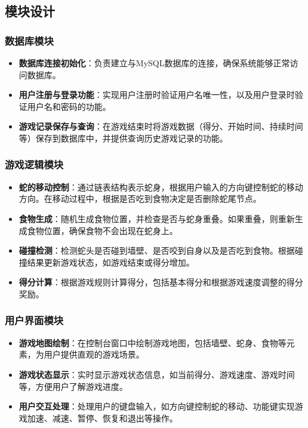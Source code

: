 \documentclass{article}
\begin{document}
\subsection{模块设计}

\subsubsection{数据库模块}
\begin{itemize}
    \item \textbf{数据库连接初始化}：负责建立与MySQL数据库的连接，确保系统能够正常访问数据库。
    \item \textbf{用户注册与登录功能}：实现用户注册时验证用户名唯一性，以及用户登录时验证用户名和密码的功能。
    \item \textbf{游戏记录保存与查询}：在游戏结束时将游戏数据（得分、开始时间、持续时间等）保存到数据库中，并提供查询历史游戏记录的功能。
\end{itemize}

\subsubsection{游戏逻辑模块}
\begin{itemize}
    \item \textbf{蛇的移动控制}：通过链表结构表示蛇身，根据用户输入的方向键控制蛇的移动方向。在移动过程中，根据是否吃到食物决定是否删除蛇尾节点。
    \item \textbf{食物生成}：随机生成食物位置，并检查是否与蛇身重叠。如果重叠，则重新生成食物位置，确保食物不会出现在蛇身上。
    \item \textbf{碰撞检测}：检测蛇头是否碰到墙壁、是否咬到自身以及是否吃到食物。根据碰撞结果更新游戏状态，如游戏结束或得分增加。
    \item \textbf{得分计算}：根据游戏规则计算得分，包括基本得分和根据游戏速度调整的得分奖励。
\end{itemize}

\subsubsection{用户界面模块}
\begin{itemize}
    \item \textbf{游戏地图绘制}：在控制台窗口中绘制游戏地图，包括墙壁、蛇身、食物等元素，为用户提供直观的游戏场景。
    \item \textbf{游戏状态显示}：实时显示游戏状态信息，如当前得分、游戏速度、游戏时间等，方便用户了解游戏进度。
    \item \textbf{用户交互处理}：处理用户的键盘输入，如方向键控制蛇的移动、功能键实现游戏加速、减速、暂停、恢复和退出等操作。
\end{itemize}
\end{document}
